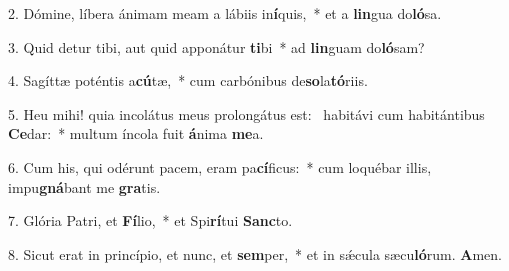 2. Dómine, líbera ánimam meam a lábiis in\textbf{í}quis,~*  et a \textbf{lin}gua do\textbf{ló}sa.\

3. Quid detur tibi, aut quid apponátur \textbf{ti}bi~*  ad \textbf{lin}guam do\textbf{ló}sam?\

4. Sagíttæ poténtis a\textbf{cú}tæ,~*  cum carbónibus de\textbf{so}la\textbf{tó}riis.\

5. Heu mihi! quia incolátus meus prolongátus est: \dag\  habitávi cum habitántibus \textbf{Ce}dar:~*  multum íncola fuit \textbf{á}nima \textbf{me}a.\

6. Cum his, qui odérunt pacem, eram pa\textbf{cí}ficus:~*  cum loquébar illis, impu\textbf{gná}bant me \textbf{gra}tis.\

7. Glória Patri, et \textbf{Fí}lio,~*  et Spi\textbf{rí}tui \textbf{Sanc}to.\

8. Sicut erat in princípio, et nunc, et \textbf{sem}per,~*  et in sǽcula sæcu\textbf{ló}rum. \textbf{A}men.\

